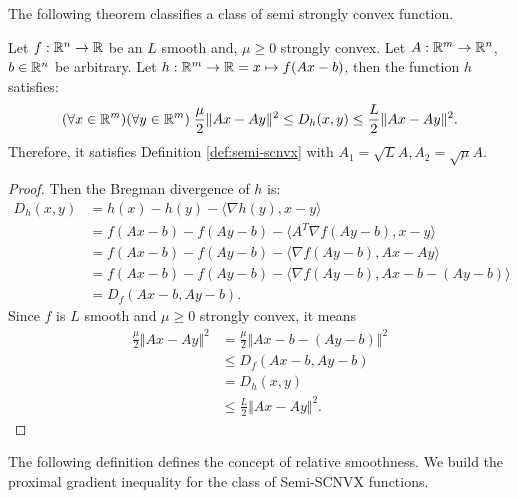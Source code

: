 \documentclass[12pt]{article}
\begin{document}
        The following theorem classifies a class of semi strongly convex function. 
        \begin{theorem}\label{thm:smooth-aff-sq-scnvs-fxn}
            Let $f: \mathbb R^n \rightarrow \mathbb R$ be an $L$ smooth and, $\mu \ge 0$ strongly convex. 
            Let $A: \mathbb R^m \rightarrow \mathbb R^n$, $b \in \mathbb R^n$ be arbitrary. 
            Let $h: \mathbb R^m \rightarrow \mathbb R= x \mapsto f(Ax - b)$, then the function $h$ satisfies: 
            \begin{align*}
                (\forall x \in \mathbb R^m)(\forall y \in \mathbb R^m)\; \frac{\mu}{2}\Vert Ax - Ay\Vert^2 
                \le D_h(x, y) \le \frac{L}{2}\Vert Ax - Ay\Vert^2. 
            \end{align*}
            Therefore, it satisfies Definition \ref{def:semi-scnvx} with $A_1 = \sqrt{L}A, A_2 = \sqrt{\mu}A$. 
        \end{theorem}
        \begin{proof}
            Then the Bregman divergence of $h$ is: 
            \begin{align*}
                D_h(x, y) &= h(x) - h(y) - \langle \nabla h(y), x - y\rangle
                \\
                &= f(Ax - b) - f(Ay - b) - \langle A^T\nabla f(Ay - b), x - y\rangle
                \\
                &= f(Ax - b) - f(Ay - b) - \langle \nabla f(Ay - b), Ax - Ay\rangle
                \\
                &= f(Ax - b) - f(Ay - b) - \langle \nabla f(Ay - b), Ax - b - (Ay - b)\rangle
                \\
                &= D_f(Ax - b, Ay - b). 
            \end{align*}
            Since $f$ is $L$ smooth and $\mu \ge 0$ strongly convex, it means 
            \begin{align*}
                \frac{\mu}{2}\Vert Ax - Ay\Vert^2
                &= 
                \frac{\mu}{2}\Vert Ax - b - (Ay - b)\Vert^2 
                \\
                &\le D_f(Ax - b, Ay - b)
                \\
                &= D_h(x, y) 
                \\
                &\le \frac{L}{2} \Vert Ax - Ay\Vert^2. 
            \end{align*}
        \end{proof}
        The following definition defines the concept of relative smoothness. 
        We build the proximal gradient inequality for the class of Semi-SCNVX functions. 
\end{document}
